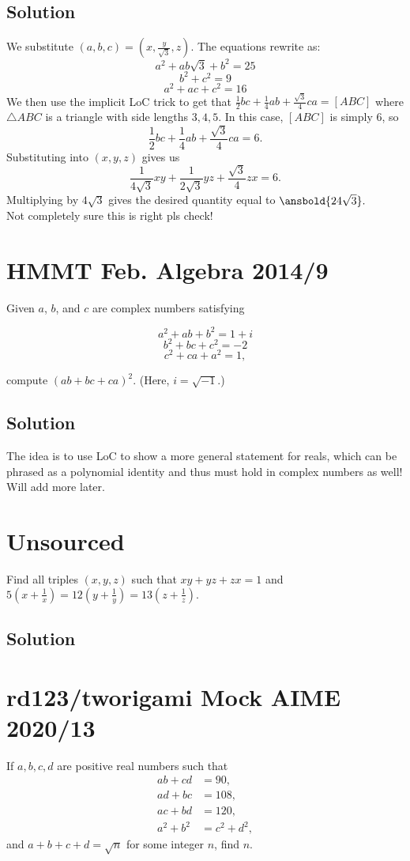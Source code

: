 \documentclass{article}
\begin{document}
\subsection{Solution}
We substitute $(a,b,c)=(x,\frac{y}{\sqrt{3}},z)$. The equations rewrite as:
$$a^2+ab\sqrt{3}+b^2=25$$
$$b^2+c^2=9$$
$$a^2+ac+c^2=16$$
We then use the implicit LoC trick to get that $\frac{1}{2}bc+\frac{1}{4}ab+\frac{\sqrt{3}}{4}ca=[ABC]$ where $\triangle ABC$ is a triangle with side lengths $3,4,5$. In this case, $[ABC]$ is simply $6$, so $$\frac{1}{2}bc+\frac{1}{4}ab+\frac{\sqrt{3}}{4}ca=6.$$
Substituting into $(x,y,z)$ gives us $$\frac{1}{4\sqrt{3}}xy+\frac{1}{2\sqrt{3}}yz+\frac{\sqrt{3}}{4}zx=6.$$ Multiplying by $4\sqrt{3}$ gives the desired quantity equal to $\ansbold{24\sqrt{3}}.$\\
Not completely sure this is right pls check!

\pagebreak\section{HMMT Feb. Algebra 2014/9}
Given $a$, $b$, and $c$ are complex numbers satisfying

\[ a^2+ab+b^2=1+i \]
\[ b^2+bc+c^2=-2 \]
\[ c^2+ca+a^2=1, \]

compute $(ab+bc+ca)^2$. (Here, $i=\sqrt{-1}$.)

\subsection{Solution}
The idea is to use LoC to show a more general statement for reals, which can be phrased as a polynomial identity and thus must hold in complex numbers as well! Will add more later.

\pagebreak\section{Unsourced}
Find all triples $(x,y,z)$ such that $xy+yz+zx=1$ and $5(x+\frac{1}{x})=12(y+\frac{1}{y})=13(z+\frac{1}{z}).$

\subsection{Solution}

\pagebreak\section{rd123/tworigami Mock AIME 2020/13}
If $a,b,c,d$ are positive real numbers such that
\begin{align*} ab + cd &= 90, \\ ad + bc &= 108, \\ ac + bd &= 120, \\ a^2+b^2 &= c^2+d^2, \end{align*}and $a+b+c+d=\sqrt{n}$ for some integer $n$, find $n$.
\end{document}
